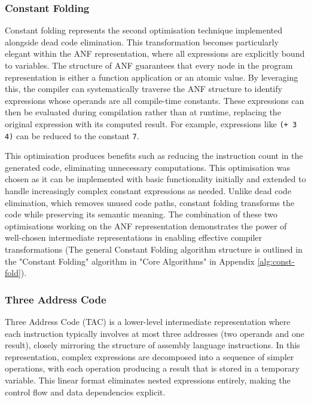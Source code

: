 \documentclass[final]{cmpreport_02}
\begin{document}
\subsubsection{Constant Folding}
Constant folding represents the second optimisation technique implemented alongside dead code elimination. This transformation becomes particularly elegant within the ANF representation, where all expressions are explicitly bound to variables. The structure of ANF guarantees that every node in the program representation is either a function application or an atomic value.
By leveraging this, the compiler can systematically traverse the ANF structure to identify expressions whose operands are all compile-time constants. These expressions can then be evaluated during compilation rather than at runtime, replacing the original expression with its computed result. For example, expressions like \texttt{(+ 3 4)} can be reduced to the constant \texttt{7}.\newline

This optimisation produces benefits such as reducing the instruction count in the generated code, eliminating unnecessary computations. This optimisation was chosen as it can be implemented with basic functionality initially and extended to handle increasingly complex constant expressions as needed.
Unlike dead code elimination, which removes unused code paths, constant folding transforms the code while preserving its semantic meaning. The combination of these two optimisations working on the ANF representation demonstrates the power of well-chosen intermediate representations in enabling effective compiler transformations
(The general Constant Folding algorithm structure is outlined in the "Constant Folding" algorithm in "Core Algorithms" in Appendix \ref{alg:const-fold}).

\subsubsection{Three Address Code}
Three Address Code (TAC) is a lower-level intermediate representation where each instruction typically involves at most three addresses (two operands and one result), closely mirroring the structure of assembly language instructions. In this representation, complex expressions are decomposed into a sequence of simpler operations, with each operation producing a result that is stored in a temporary variable. This linear format eliminates nested expressions entirely, making the control flow and data dependencies explicit.\newline
\end{document}
